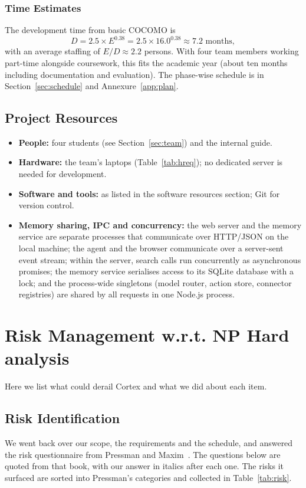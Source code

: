 \documentclass[oneside,a4paper,12pt]{report}
\begin{document}
\subsubsection{Time Estimates}
The development time from basic COCOMO is
\[ D = 2.5 \times E^{0.38} = 2.5 \times 16.0^{0.38} \approx 7.2 \mbox{ months}, \]
with an average staffing of $E/D \approx 2.2$ persons. With four team members working part-time alongside coursework, this fits the academic year (about ten months including documentation and evaluation). The phase-wise schedule is in Section~\ref{sec:schedule} and Annexure~\ref{app:plan}.


\subsection{Project Resources}
\begin{itemize}
\item \textbf{People:} four students (see Section~\ref{sec:team}) and the internal guide.
\item \textbf{Hardware:} the team's laptops (Table~\ref{tab:hreq}); no dedicated server is needed for development.
\item \textbf{Software and tools:} as listed in the software resources section; Git for version control.
\item \textbf{Memory sharing, IPC and concurrency:} the web server and the memory service are separate processes that communicate over HTTP/JSON on the local machine; the agent and the browser communicate over a server-sent event stream; within the server, search calls run concurrently as asynchronous promises; the memory service serialises access to its SQLite database with a lock; and the process-wide singletons (model router, action store, connector registries) are shared by all requests in one Node.js process.
\end{itemize}

\section{Risk Management w.r.t. NP Hard analysis}
Here we list what could derail Cortex and what we did about each item.
\subsection{Risk Identification}
We went back over our scope, the requirements and the schedule, and answered the risk questionnaire from Pressman and Maxim~\cite{bookPressman}. The questions below are quoted from that book, with our answer in italics after each one. The risks it surfaced are sorted into Pressman's categories and collected in Table~\ref{tab:risk}.
\end{document}
